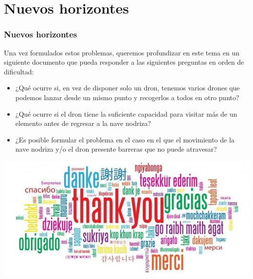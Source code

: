 \documentclass[slidestop,usepdftitle=false, xcolor=table]{beamer}
\begin{document}
	\section{Nuevos horizontes}
	\begin{frame}
		\frametitle{Nuevos horizontes}
		Una vez formulados estos problemas, queremos profundizar en este tema en un siguiente documento que pueda responder a las siguientes preguntas en orden de dificultad:
		\begin{itemize}
			\item ¿Qué ocurre si, en vez de disponer solo un dron, tenemos varios drones que podemos lanzar desde un mismo punto y recogerlos a todos en otro punto?
			\pause
			\item ¿Qué ocurre si el dron tiene la suficiente capacidad para visitar más de un elemento antes de regresar a la nave nodriza?
			\pause
			\item ¿Es posible formular el problema en el caso en el que el movimiento de la nave nodriza y/o el dron presente barreras que no puede atravesar?
		\end{itemize}
	\end{frame}


	\begin{frame}
		\vspace{1.5cm}
		\hspace{1.5cm}
		\includegraphics[width=0.7\linewidth]{gracias}
	\end{frame}
\end{document}
